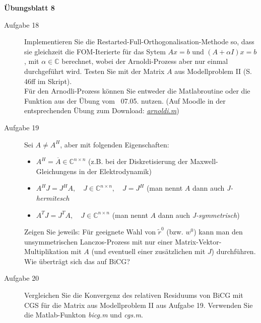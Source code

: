 \documentclass[a4paper,11pt]{scrartcl}
\begin{document}
\aihead

\begin{center}
  {\large\textbf{Übungsblatt 8}}
\end{center}


\begin{description}
\item[Aufgabe 18]
Implementieren Sie die Restarted-Full-Orthogonalisation-Methode so, dass sie gleichzeit die FOM-Iterierte für das Sytem $Ax = b$ und $(A + \alpha I)x = b$, mit $\alpha \in \mathbb{C}$ berechnet, wobei der Arnoldi-Prozess aber nur einmal durchgeführt wird. Testen Sie mit der Matrix $A$ aus Modellproblem II (S. 46ff im Skript).\\
Für den Arnodli-Prozess können Sie entweder die Matlabroutine oder die Funktion aus der Übung vom ~07.05. nutzen. (Auf Moodle in der entsprechenden Übung zum Download: \href{https://moodle.uni-wuppertal.de/pluginfile.php/1382550/mod_folder/content/0/arnoldi.m?forcedownload=1}{\textit{arnoldi.m}})
 \medskip
 
\item[Aufgabe 19]
Sei $A\neq A^H$, aber mit folgenden Eigenschaften:
\begin{itemize}
\item $A^H = \overline{A} \in \mathbb{C}^{n \times n}$ (z.B. bei der Diskretisierung der Maxwell-Gleichungens in der Elektrodynamik)
\item $A^H J = J^H A, \quad J\in \mathbb{C}^{n\times n}, \quad J = J^H$ (man nennt $A$ dann auch \textit{J-hermitesch}
\item $A^T J = J^T A, \quad J \in \mathbb{C}^{n\times n}$ (man nennt $A$ dann auch \textit{J-symmetrisch})
\end{itemize}
Zeigen Sie jeweils: Für geeignete Wahl von $\tilde{r}^0$ (bzw. $w^0$) kann man den unsymmetrischen Lanczos-Prozess mit nur einer Matrix-Vektor-Multiplikation mit $A$ (und eventuell einer zusätzlichen mit $J$) durchführen. Wie überträgt sich das auf BiCG?
\medskip
 
\item[Aufgabe 20]
Vergleichen Sie die Konvergenz des relativen Residuums von BiCG mit CGS für die Matrix aus Modellproblem II aus Aufgabe 19. Verwenden Sie die Matlab-Funkton \textit{bicg.m} und \textit{cgs.m}.
\end{description}
\end{document}
